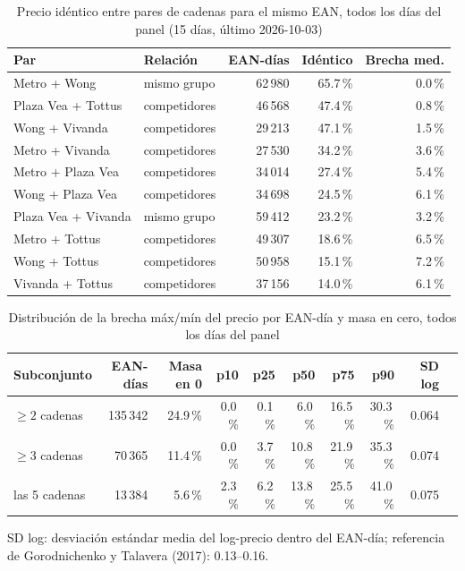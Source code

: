 
\begin{table}[htbp]
\caption{Precio id\'entico entre pares de cadenas para el mismo EAN, todos los d\'ias del panel (15 d\'ias, \'ultimo 2026-10-03)}
\label{tab:identidad}
\centering\scriptsize\setlength{\tabcolsep}{3pt}
\begin{tabular}{@{}llrrr@{}}
\toprule
Par & Relaci\'on & EAN-d\'ias & Id\'entico & Brecha med. \\
\midrule
Metro + Wong & mismo grupo & 62\,980 & 65.7\,\% & 0.0\,\% \\
Plaza Vea + Tottus & competidores & 46\,568 & 47.4\,\% & 0.8\,\% \\
Wong + Vivanda & competidores & 29\,213 & 47.1\,\% & 1.5\,\% \\
Metro + Vivanda & competidores & 27\,530 & 34.2\,\% & 3.6\,\% \\
Metro + Plaza Vea & competidores & 34\,014 & 27.4\,\% & 5.4\,\% \\
Wong + Plaza Vea & competidores & 34\,698 & 24.5\,\% & 6.1\,\% \\
Plaza Vea + Vivanda & mismo grupo & 59\,412 & 23.2\,\% & 3.2\,\% \\
Metro + Tottus & competidores & 49\,307 & 18.6\,\% & 6.5\,\% \\
Wong + Tottus & competidores & 50\,958 & 15.1\,\% & 7.2\,\% \\
Vivanda + Tottus & competidores & 37\,156 & 14.0\,\% & 6.1\,\% \\
\bottomrule\end{tabular}\end{table}

\begin{table}[t]
\caption{Distribuci\'on de la brecha m\'ax/m\'in del precio por EAN-d\'ia y masa en cero, todos los d\'ias del panel}
\label{tab:brecha}
\centering\scriptsize\setlength{\tabcolsep}{4pt}
\begin{tabular}{@{}lrrrrrrrrr@{}}
\toprule
Subconjunto & EAN-d\'ias & Masa en 0 & p10 & p25 & p50 & p75 & p90 & SD log \\
\midrule
$\geq 2$ cadenas & 135\,342 & 24.9\,\% & 0.0\,\% & 0.1\,\% & 6.0\,\% & 16.5\,\% & 30.3\,\% & 0.064 \\
$\geq 3$ cadenas & 70\,365 & 11.4\,\% & 0.0\,\% & 3.7\,\% & 10.8\,\% & 21.9\,\% & 35.3\,\% & 0.074 \\
las 5 cadenas & 13\,384 & 5.6\,\% & 2.3\,\% & 6.2\,\% & 13.8\,\% & 25.5\,\% & 41.0\,\% & 0.075 \\
\bottomrule\end{tabular}
\par\smallskip\raggedright\scriptsize SD log: desviaci\'on est\'andar media del log-precio dentro del EAN-d\'ia; referencia de Gorodnichenko y Talavera (2017): 0.13--0.16.
\end{table}

